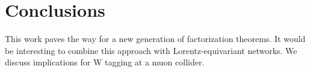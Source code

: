 \section{Conclusions}\label{sec:conclusions}

This work paves the way for a new generation of factorization theorems.
It would be interesting to combine this approach with
Lorentz-equivariant networks. We discuss implications for W tagging at a
muon collider.

